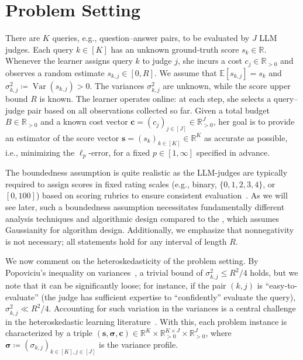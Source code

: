 \documentclass{article}
\def\vc{{\bm{c}}}
\def\vs{{\bm{s}}}
\def\sR{{\mathbb{R}}}
\theoremstyle{plain}
\theoremstyle{definition}
\theoremstyle{plain}
\begin{document}
\section{Problem Setting}
\label{sec:setting}
There are \(K\) queries, e.g., question--answer pairs, to be evaluated by \(J\) LLM judges. Each query \(k\in[K]\) has an unknown ground-truth score \(s_k \in \mathbb{R}\). Whenever the learner assigns query \(k\) to judge \(j\), she incurs a cost \(c_j \in \mathbb{R}_{>0}\) and observes a random estimate \(s_{k,j}\in[0,R]\).
We assume that $\mathbb{E}[s_{k,j}] = s_k$ and $\sigma_{k,j}^2 \coloneq \operatorname{Var}(s_{k,j}) > 0$. The variances \(\sigma_{k,j}^2\) are unknown, while the score upper bound \(R\) is known. The learner operates online: at each step, she selects a query--judge pair based on all observations collected so far. Given a total budget \(B\in\mathbb{R}_{>0}\) and a known cost vector \(\mathbf{c}=(c_j)_{j\in[J]}\in\mathbb{R}_{>0}^J\), her goal is to provide an estimator of the score vector $\mathbf{s}=(s_k)_{k\in[K]}\in\mathbb{R}^K$ as accurate as possible, i.e., minimizing the \(\ell_p\)-error, for a fixed \(p \in [1,\infty]\) specified in advance.



The boundedness assumption is quite realistic as the LLM-judges are typically required to assign scores in fixed rating scales (e.g., binary, $\{0,1,2,3,4\}$, or $[0,100]$) based on scoring rubrics to ensure consistent evaluation~\citep{gu2025surveyllmasajudge}.
As we will see later, such a boundedness assumption necessitates fundamentally different analysis techniques and algorithmic design compared to the \cite{saha2026budget}, which assumes Gaussianity for algorithm design.
Additionally, we emphasize that nonnegativity is not necessary; all statements hold for any interval of length $R$.

We now comment on the heteroskedasticity of the problem setting.
By Popoviciu's inequality on variances~\citep{popoviciu}, a trivial bound of $\sigma_{k,j}^2 \leq R^2 / 4$ holds, but we note that it can be significantly loose; for instance, if the pair $(k, j)$ is ``easy-to-evaluate'' (the judge has sufficient expertise to ``confidently'' evaluate the query), $\sigma_{k,j}^2 \ll R^2 / 4$.
Accounting for such variation in the variances is a central challenge in the heteroskedastic learning literature~\citep{chaudhuri2017heteroskedastic,kirschner2018heteroskedastic,fontaine2021heteroskedastic}.
With this, each problem instance is characterized by a triple $(\vs, \bm\sigma, \vc) \in \sR^K \times \sR_{> 0}^{K\times J} \times \sR^J_{> 0}$, where $\bm\sigma \coloneq (\sigma_{k,j})_{k\in [K],j\in [J]}$ is the variance profile.
\end{document}
